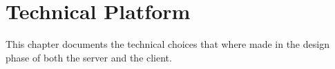\chapter{Technical Platform}\label{cha:technicalPlatform}

This chapter documents the technical choices that where made in the design phase of both the server and the client. 	







